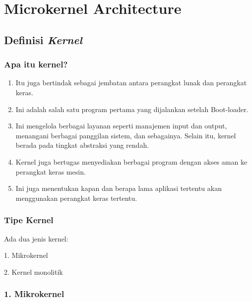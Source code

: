 \chapter{Microkernel Architecture}
	\author{Bryan Elmer Purnomo, Richard Haryono Yang, Paris Matio}
	

\section{Definisi \textit{Kernel}}

	\subsection{Apa itu kernel?}
	\begin{enumerate}
		
		\item Itu juga bertindak sebagai jembatan antara perangkat lunak dan perangkat keras. 
		
		\item Ini adalah salah satu program pertama yang dijalankan setelah Boot-loader.
		
		\item Ini mengelola berbagai layanan seperti manajemen input dan output, menangani berbagai panggilan sistem, dan sebagainya. Selain itu, kernel berada pada tingkat abstraksi yang rendah.
		
		\item Kernel juga bertugas menyediakan berbagai program dengan akses aman ke perangkat keras mesin. 
		
		\item Ini juga menentukan kapan dan berapa lama aplikasi tertentu akan menggunakan perangkat keras tertentu.
		
	\end{enumerate}	
	
	\vskip0.5cm

\subsection{Tipe Kernel}

Ada dua jenis kernel:

1. Mikrokernel

2. Kernel monolitik

\vskip0.5cm

\subsection{1. Mikrokernel}

